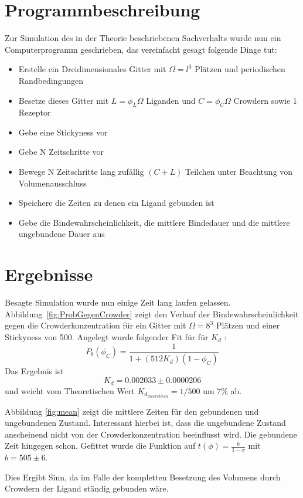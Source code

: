 \documentclass[bachelor,       %
               twoside,        %
               BCOR10mm,       %
               english,ngerman, %
               ]{GAUBM}
\begin{document}
\chapter{Programmbeschreibung}
Zur Simulation des in der Theorie beschriebenen Sachverhalts wurde nun ein Computerprogramm geschrieben, das
vereinfacht gesagt folgende Dinge tut:
\begin{itemize}
\item Erstelle ein Dreidimensionales Gitter mit $\Omega = l^3$ Plätzen und periodischen Randbedingungen
\item Besetze dieses Gitter mit $L = \phi_L\Omega$ Liganden und $C = \phi_C\Omega$ Crowdern sowie 1 Rezeptor
\item Gebe eine Stickyness vor
\item Gebe N Zeitschritte vor
\item Bewege N Zeitschritte lang zufällig $(C+L)$ Teilchen unter Beachtung von Volumenausschluss
\item Speichere die Zeiten zu denen ein Ligand gebunden ist
\item Gebe die Bindewahrscheinlichkeit, die mittlere Bindedauer und die mittlere ungebundene Dauer aus
\end{itemize}

\chapter{Ergebnisse}
Besagte Simulation wurde nun einige Zeit lang laufen gelassen.
Abbildung~\ref{fig:ProbGegenCrowder} zeigt den Verlauf der Bindewahrscheinlichkeit
gegen die Crowderkonzentration für ein Gitter mit $\Omega = 8^3$ Plätzen und einer
Stickyness von 500. Angelegt wurde folgender Fit für für $K_d$ :
\begin{equation}
P_b(\phi_C) = \frac{1}{1+(512K_d)(1-\phi_C)}
\end{equation}
Das Ergebnis ist
\begin{equation}
K_d = 0.002033 \pm 0.0000206
\end{equation}
und weicht vom Theoretischen Wert $K_{d_{theoretisch}} = 1/500 $ um 7\% ab.

Abbildung \ref{fig:mean} zeigt die mittlere Zeiten für den gebundenen und ungebundenen
Zustand. Interessant hierbei ist, dass die ungebundene Zustand anscheinend nicht von
der Crowderkonzentration beeinflusst wird. Die gebundene Zeit hingegen schon.
Gefittet wurde die Funktion auf $t(\phi) = \frac{b}{1-x}$ mit $b = 505 \pm 6$.

Dies Ergibt Sinn, da im Falle der kompletten Besetzung des Volumens durch Crowdern der
Ligand ständig gebunden wäre.
\end{document}
